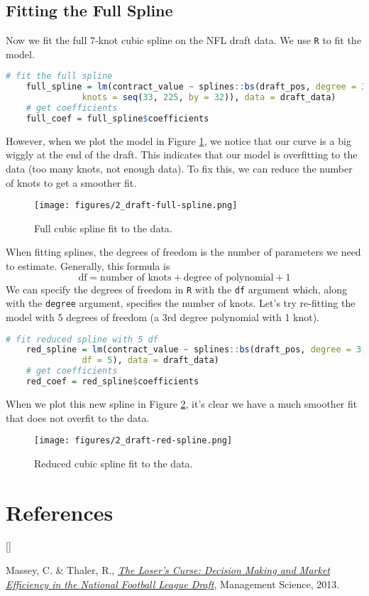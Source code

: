 \documentclass[twoside]{article}
\def\beginrefs{\begin{list}%
        {[\arabic{equation}]}{\usecounter{equation}
         \setlength{\leftmargin}{2.0truecm}\setlength{\labelsep}{0.4truecm}%
         \setlength{\labelwidth}{1.6truecm}}}
\def\endrefs{\end{list}}
\def\bibentry#1{\item[\hbox{[#1]}]}
\theoremstyle{definition}
\begin{document}
\subsection{Fitting the Full Spline}

Now we fit the full 7-knot cubic spline on the NFL draft data. We use \texttt{R} to fit the model.
\begin{lstlisting}[language=R]
    # fit the full spline
    full_spline = lm(contract_value ~ splines::bs(draft_pos, degree = 3,
               knots = seq(33, 225, by = 32)), data = draft_data)
    # get coefficients
    full_coef = full_spline$coefficients
\end{lstlisting}
However, when we plot the model in Figure \ref{fig:draft-full-spline}, we notice that our curve is a big wiggly at the end of the draft. This indicates that our model is overfitting to the data (too many knots, not enough data). To fix this, we can reduce the number of knots to get a smoother fit.

\begin{figure}[H]
    \centering
    \texttt{[image: figures/2\_draft-full-spline.png]}
    \caption{Full cubic spline fit to the data.}
    \label{fig:draft-full-spline}
\end{figure}

When fitting splines, the degrees of freedom is the number of parameters we need to estimate. Generally, this formula is
\begin{equation}
    \text{df} = \text{number of knots} + \text{degree of polynomial} + 1
\end{equation}
We can specify the degrees of freedom in \texttt{R} with the \texttt{df} argument which, along with the \texttt{degree} argument, specifies the number of knots. Let's try re-fitting the model with 5 degrees of freedom (a 3rd degree polynomial with 1 knot).
\begin{lstlisting}[language=R]
    # fit reduced spline with 5 df
    red_spline = lm(contract_value ~ splines::bs(draft_pos, degree = 3,
               df = 5), data = draft_data)
    # get coefficients
    red_coef = red_spline$coefficients
\end{lstlisting}
When we plot this new spline in Figure \ref{fig:draft-red-spline}, it's clear we have a much smoother fit that does not overfit to the data.
\begin{figure}[H]
    \centering
    \texttt{[image: figures/2\_draft-red-spline.png]}
    \caption{Reduced cubic spline fit to the data.}
    \label{fig:draft-red-spline}
\end{figure}

\section*{References}
\beginrefs
\bibentry{M-T}{Massey, C. \& Thaler, R.}, 
{\it \href{https://faculty.wharton.upenn.edu/wp-content/uploads/2013/08/massey---thaler---losers-curse---management-science-july-2013.pdf}{The Loser's Curse: Decision Making and Market
Efficiency in the National Football League Draft}},
{Management Science},
{2013}.
\endrefs
\end{document}

